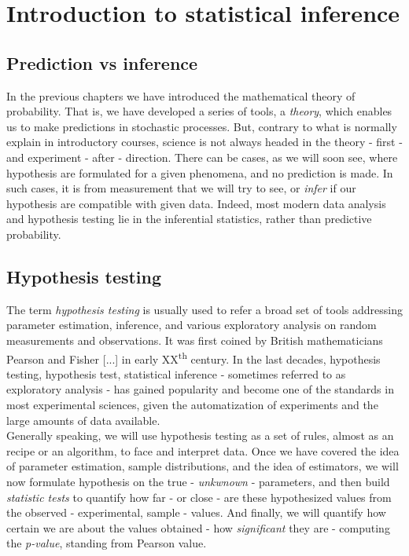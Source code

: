 \documentclass{book}
\begin{document}
\chapter{Introduction to statistical inference}

\section{Prediction vs inference}
In the previous chapters we have introduced the mathematical theory of probability. That is, we have developed a series of tools, a \textit{theory}, which enables us to make predictions in stochastic processes. But, contrary to what is normally explain in introductory courses, science is not always headed in the theory - first - and experiment - after - direction. There can be cases, as we will soon see, where hypothesis are formulated for a given phenomena, and no prediction is made. In such cases, it is from measurement that we will try to see, or \textit{infer} if our hypothesis are compatible with given data. Indeed, most modern data analysis and hypothesis testing lie in the inferential statistics, rather than predictive probability.

\section{Hypothesis testing}
The term \textit{hypothesis testing} is usually used to refer a broad set of tools addressing parameter estimation, inference, and various exploratory analysis on random measurements and observations. It was first coined by British mathematicians Pearson and Fisher [...] in early XX\textsuperscript{th} century. In the last decades, hypothesis testing, hypothesis test, statistical inference - sometimes referred to as  exploratory analysis - has gained popularity and become one of the standards in most experimental sciences, given the automatization of experiments and the large amounts of data available.\\

Generally speaking, we will use hypothesis testing as a set of rules, almost as an recipe or an algorithm, to face and interpret data. Once we have covered the idea of parameter estimation, sample distributions, and the idea of estimators, we will now formulate hypothesis on the true - \textit{unkwnown} - parameters, and then build \textit{statistic tests} to quantify how far - or close - are these hypothesized values from the observed - experimental, sample - values. And finally, we will quantify how certain we are about the values obtained - how \textit{significant} they are - computing the \textit{p-value}, standing from Pearson value.\\
\end{document}
